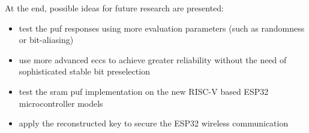 At the end, possible ideas for future research are presented:
\begin{itemize}
    \item test the \gls{puf} responses using more evaluation parameters (such as randomness or bit-aliasing)
    \item use more advanced \glspl{ecc} to achieve greater reliability without the need of sophisticated stable bit preselection
    \item test the \gls{sram} \gls{puf} implementation on the new RISC-V based ESP32 microcontroller models
    \item apply the reconstructed key to secure the ESP32 wireless communication
\end{itemize}


